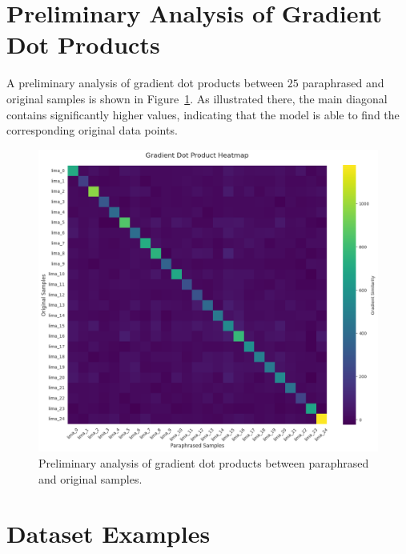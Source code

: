 \section{Preliminary Analysis of Gradient Dot Products}
A preliminary analysis of gradient dot products between $25$ paraphrased and original samples is shown in Figure~\ref{fig:preliminary_analysis_dot_products}. As illustrated there, the main diagonal contains significantly higher values, indicating that the model is able to find the corresponding original data points. 

\begin{figure}[ht]
    \centering
    \includegraphics[width=1\textwidth]{figures/preliminary_analysis_dot_products.png}
    \caption{Preliminary analysis of gradient dot products between paraphrased and original samples.}
    \label{fig:preliminary_analysis_dot_products}
\end{figure}

\section{Dataset Examples}

